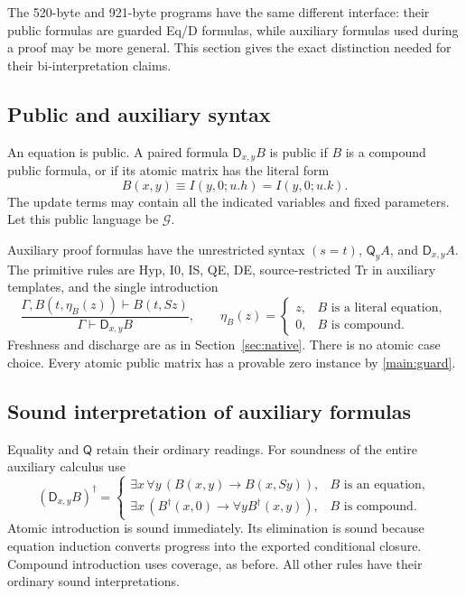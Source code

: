 \documentclass[11pt,letterpaper]{article}
\theoremstyle{definition}\newtheorem{definition}[theorem]{Definition}
\theoremstyle{remark}\newtheorem{remark}[theorem]{Remark}
\newcommand{\D}{\mathsf D}
\newcommand{\Q}{\mathsf Q}
\newcommand{\G}{\mathcal G}
\begin{document}
The 520-byte and 921-byte programs have the same different interface:
their public formulas are guarded Eq/D formulas, while auxiliary
formulas used during a proof may be more general. This section gives
the exact distinction needed for their bi-interpretation claims.

\subsection{Public and auxiliary syntax}

An equation is public. A paired formula $\D_{x,y}B$ is public if $B$ is
a compound public formula, or if its atomic matrix has the literal form
\begin{equation}
 B(x,y)\equiv I(y,0;u.h)=I(y,0;u.k).
 \label{main:guard}
\end{equation}
The update terms may contain all the indicated variables and fixed
parameters. Let this public language be $\G$.

Auxiliary proof formulas have the unrestricted syntax
$(s=t)$, $\Q_yA$, and $\D_{x,y}A$. The primitive rules are Hyp, I0,
IS, QE, DE, source-restricted Tr in auxiliary templates, and the single
introduction
\[
 \frac{\Gamma,B(t,\eta_B(z))\vdash B(t,Sz)}
      {\Gamma\vdash\D_{x,y}B},\qquad
 \eta_B(z)=\begin{cases}
 z,&B\text{ is a literal equation},\\
 0,&B\text{ is compound}.
 \end{cases}
\]
Freshness and discharge are as in Section~\ref{sec:native}.
There is no atomic case choice. Every atomic public matrix has a
provable zero instance by \eqref{main:guard}.

\subsection{Sound interpretation of auxiliary formulas}

Equality and $\Q$ retain their ordinary readings. For soundness of the
entire auxiliary calculus use
\[
 (\D_{x,y}B)^\dagger=
 \begin{cases}
 \exists x\,\forall y\,(B(x,y)\to B(x,Sy)),&B\text{ is an equation},\\
 \exists x\,(B^\dagger(x,0)\to\forall yB^\dagger(x,y)),&B\text{ is compound}.
 \end{cases}
\]
Atomic introduction is sound immediately. Its elimination is sound
because equation induction converts progress into the exported
conditional closure. Compound introduction uses coverage, as before.
All other rules have their ordinary sound interpretations.
\end{document}
